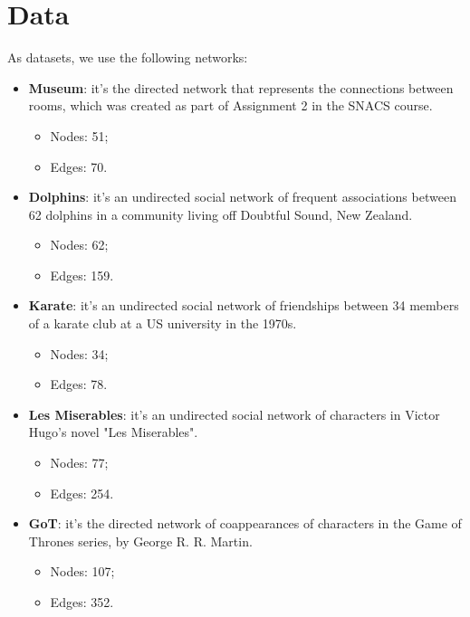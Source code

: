 \documentclass[sigconf]{acmart}
\begin{document}
			
\section{Data} \label{sec:data}
As datasets, we use the following networks:
\begin{itemize}
    \item \textbf{Museum}: it's the directed network that represents the connections between rooms, which was created as part of Assignment 2 in the SNACS course.
    \begin{itemize}
        \item Nodes: 51;
        \item Edges: 70.
    \end{itemize}
    \item \textbf{Dolphins}: it's an undirected social network of frequent associations between 62 dolphins in a community living off Doubtful Sound, New Zealand. \cite{dolphins}
    \begin{itemize}
        \item Nodes: 62;
        \item Edges: 159.
    \end{itemize}
    \item \textbf{Karate}: it's an undirected social network of friendships between 34 members of a karate club at a US university in the 1970s. \cite{karate}
    \begin{itemize}
        \item Nodes: 34;
        \item Edges: 78.
    \end{itemize}
    \item \textbf{Les Miserables}: it's an undirected social network of characters in Victor Hugo's novel "Les Miserables". \cite{lesmiserables}
    \begin{itemize}
        \item Nodes: 77;
        \item Edges: 254.
    \end{itemize}
    \item \textbf{GoT}: it's the directed network of coappearances of characters in the Game of Thrones series, by George R. R. Martin. \cite{got}
    \begin{itemize}
        \item Nodes: 107;
        \item Edges: 352.
    \end{itemize}
\end{itemize}
\end{document}
